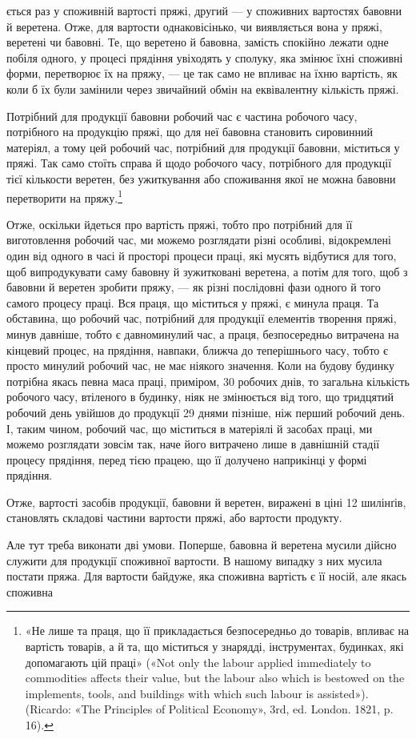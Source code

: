 ється раз у споживній вартості пряжі, другий — у споживних
вартостях бавовни й веретена. Отже, для вартости однаковісінько,
чи виявляється вона у пряжі, веретені чи бавовні. Те, що
веретено й бавовна, замість спокійно лежати одне побіля одного,
у процесі прядіння увіходять у сполуку, яка змінює їхні споживні
форми, перетворює їх на пряжу, — це так само не впливає на
їхню вартість, як коли б їх були замінили через звичайний обмін
на еквівалентну кількість пряжі.

Потрібний для продукції бавовни робочий час є частина робочого
часу, потрібного на продукцію пряжі, що для неї бавовна
становить сировинний матеріял, а тому цей робочий час, потрібний
для продукції бавовни, міститься у пряжі. Так само стоїть
справа й щодо робочого часу, потрібного для продукції тієї кількости
веретен, без ужиткування або споживання якої не можна
бавовни перетворити на пряжу.\footnote{
«Не лише та праця, що її прикладається безпосередньо до товарів,
впливає на вартість товарів, а й та, що міститься у знарядді, інструментах,
будинках, які допомагають цій праці» («Not only the labour applied
immediately to commodities affects their value, but the labour also which
is bestowed on the implements, tools, and buildings with which such
labour is assisted»). (Ricardo: «The Principles of Political Economy», 3rd,
ed. London. 1821, p. 16).
}

Отже, оскільки йдеться про вартість пряжі, тобто про потрібний
для її виготовлення робочий час, ми можемо розглядати різні
особливі, відокремлені один від одного в часі й просторі процеси
праці, які мусять відбутися для того, щоб випродукувати саму
бавовну й зужитковані веретена, а потім для того, щоб з бавовни
й веретен зробити пряжу, — як різні послідовні фази одного й
того самого процесу праці. Вся праця, що міститься у пряжі,
є минула праця. Та обставина, що робочий час, потрібний для
продукції елементів творення пряжі, минув давніше, тобто є
давноминулий час, а праця, безпосередньо витрачена на кінцевий
процес, на прядіння, навпаки, ближча до теперішнього часу,
тобто є просто минулий робочий час, не має ніякого значення.
Коли на будову будинку потрібна якась певна маса праці, приміром,
30 робочих днів, то загальна кількість робочого часу,
втіленого в будинку, ніяк не змінюється від того, що тридцятий
робочий день увійшов до продукції 29 днями пізніше, ніж перший
робочий день. І, таким чином, робочий час, що міститься в матеріялі
й засобах праці, ми можемо розглядати зовсім так, наче
його витрачено лише в давнішній стадії процесу прядіння, перед
тією працею, що її долучено наприкінці у формі прядіння.

Отже, вартості засобів продукції, бавовни й веретен, виражені
в ціні 12 шилінґів, становлять складові частини вартости пряжі,
або вартости продукту.

Але тут треба виконати дві умови. Поперше, бавовна й веретена
мусили дійсно служити для продукції споживної вартости.
В нашому випадку з них мусила постати пряжа. Для вартости
байдуже, яка споживна вартість є її носій, але якась споживна